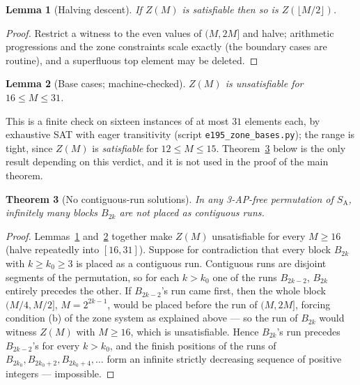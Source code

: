 \documentclass[11pt]{article}
\newtheorem{theorem}{Theorem}
\newtheorem{lemma}[theorem]{Lemma}
\theoremstyle{definition}
\newcommand{\SA}{S_{\mathrm{A}}}
\begin{document}
\begin{lemma}[Halving descent]\label{lem:halving}
If $Z(M)$ is satisfiable then so is $Z(\lfloor M/2 \rfloor)$.
\end{lemma}

\begin{proof}
Restrict a witness to the even values of $(M,2M]$ and halve; arithmetic
progressions and the zone constraints scale exactly (the boundary cases are
routine), and a superfluous top element may be deleted.
\end{proof}

\begin{lemma}[Base cases; machine-checked]\label{lem:bases}
$Z(M)$ is unsatisfiable for $16 \le M \le 31$.
\end{lemma}

\noindent This is a finite check on sixteen instances of at most $31$
elements each, by exhaustive SAT with eager transitivity (script
\texttt{e195\_zone\_bases.py}); the range is tight, since $Z(M)$ is
\emph{satisfiable} for $12 \le M \le 15$. Theorem~\ref{thm:contig} below
is the only result depending on this verdict, and it is not used in the
proof of the main theorem.

\begin{theorem}[No contiguous-run solutions]\label{thm:contig}
In any 3-AP-free permutation of $\SA$, infinitely many blocks $B_{2k}$ are
\emph{not} placed as contiguous runs.
\end{theorem}

\begin{proof}
Lemmas~\ref{lem:halving} and~\ref{lem:bases} together make $Z(M)$
unsatisfiable for every $M \ge 16$ (halve repeatedly into $[16, 31]$).
Suppose for contradiction that every block $B_{2k}$ with $k \ge k_0 \ge 3$
is placed as a contiguous run. Contiguous runs are disjoint segments of the
permutation, so for each $k > k_0$ one of the runs $B_{2k-2}$, $B_{2k}$
entirely precedes the other. If $B_{2k-2}$'s run came first, then the whole
block $(M/4, M/2]$, $M = 2^{2k-1}$, would be placed before the run of
$(M, 2M]$, forcing condition (b) of the zone system as explained above ---
so the run of $B_{2k}$ would witness $Z(M)$ with $M \ge 16$, which is
unsatisfiable. Hence $B_{2k}$'s run precedes $B_{2k-2}$'s for every
$k > k_0$, and the finish positions of the runs of
$B_{2k_0}, B_{2k_0+2}, B_{2k_0+4}, \dots$ form an infinite strictly
decreasing sequence of positive integers --- impossible.
\end{proof}
\end{document}
